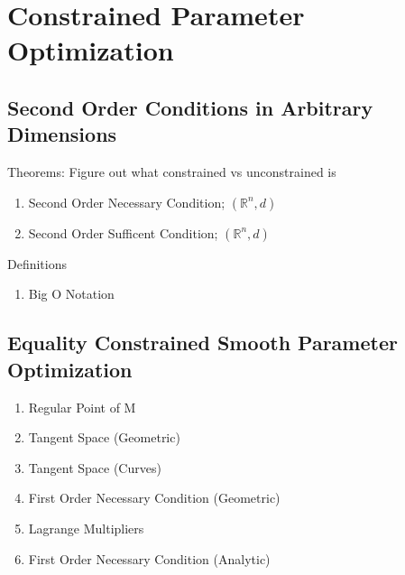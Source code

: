 \section{Constrained Parameter Optimization}

\subsection{Second Order Conditions in Arbitrary Dimensions}
\begin{summary}
    Theorems: Figure out what constrained vs unconstrained is
    \begin{enumerate}
        \item Second Order Necessary Condition; $(\mathbb{R}^n,d)$
        \item Second Order Sufficent Condition; $(\mathbb{R}^n,d)$
    \end{enumerate}
\end{summary}

\begin{summary}
    Definitions
    \begin{enumerate}
        \item Big O Notation
    \end{enumerate}
\end{summary}

\subsection{Equality Constrained Smooth Parameter Optimization}

\begin{enumerate}
    \item Regular Point of M
    \item Tangent Space (Geometric)
    \item Tangent Space (Curves)
    \item First Order Necessary Condition (Geometric)
    \item Lagrange Multipliers
    \item First Order Necessary Condition (Analytic)
\end{enumerate}